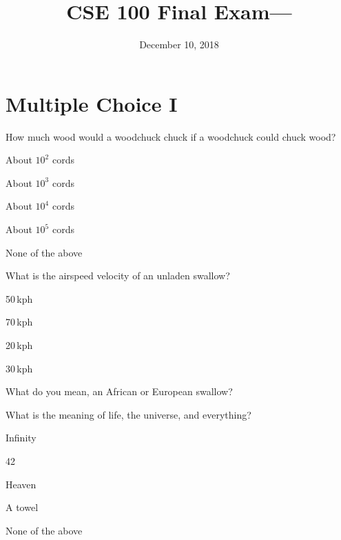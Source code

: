 \documentclass[11pt,nochoiceboxes,solutions,internaltesting]{exam3}
\begin{document}
\title{CSE 100 Final Exam---\fbox{\textbf{\examversionname}}}
\date{December 10, 2018}
\maketitle

\thispagestyle{fancy}
\setlength{\partopsep}{0pt}

\section*{Multiple Choice I}

\begin{problem}{2}
  How much wood would a woodchuck chuck if a woodchuck could chuck wood?
  \begin{multichoice}
    \item *About $10^2$ cords
    \item About $10^3$ cords
    \item About $10^4$ cords
    \item About $10^5$ cords
    \item None of the above
  \end{multichoice}
\end{problem}

%
%
\begin{problem}{2}
  What is the airspeed velocity of an unladen swallow?
  \begin{multichoice}[order=badce]
    \item 50\,kph
    \item 70\,kph
    \item 20\,kph
    \item 30\,kph
    \item *What do you mean, an African or European swallow?
  \end{multichoice}
\end{problem}

%
%
\begin{problem}{2}
  What is the meaning of life, the universe, and everything?
  \begin{multichoice}[set=E]
    \item Infinity
    \item *42
    \item Heaven
    \item A towel
    \item None of the above
  \end{multichoice}
\end{problem}
\end{document}
